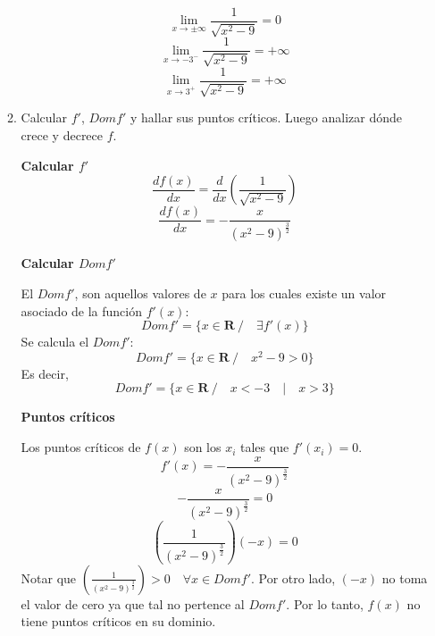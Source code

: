 \documentclass{article}
\begin{document}
\begin{enumerate}
\begin{enumerate}
                    $$\lim_{x\to \pm \infty} \frac{1}{\sqrt{x^2-9}} = 0$$
                    $$\lim_{x\to -3^-} \frac{1}{\sqrt{x^2-9}} = +\infty$$
                    $$\lim_{x\to 3^+} \frac{1}{\sqrt{x^2-9}} = +\infty$$

              \item Calcular $f'$, $Domf'$ y hallar sus puntos críticos. Luego analizar dónde crece y decrece $f$.

                    \textbf{Calcular $f'$}
                    $$\frac{d f(x)}{dx} = \frac{d}{d x} \left(\frac{1}{\sqrt{x^2-9}} \right)$$
                    $$\frac{d f(x)}{dx}= -\frac{x}{(x^2-9)^{\frac{3}{2}}}$$

                    \textbf{Calcular $Domf'$}

                    El $Domf'$, son aquellos valores de $x$ para los cuales existe un valor asociado de la función $f'(x)$:
                    $$Domf' = \{ x \in \mathbf{R}\ / \quad \exists f'(x)\}$$
                    Se calcula el $Domf'$:
                    $$Domf'= \{ x \in \mathbf{R}\ / \quad x^2-9 > 0\}$$
                    Es decir,
                    $$Domf'= \{ x \in \mathbf{R}\ / \quad x<-3 \quad | \quad x>3 \}$$

                    \textbf{Puntos críticos}

                    Los puntos críticos de $f(x)$ son los $x_i$ tales que $f'(x_i) = 0$.
                    $$f'(x) = -\frac{x}{(x^2-9)^{\frac{3}{2}}}$$
                    $$-\frac{x}{(x^2-9)^{\frac{3}{2}}} = 0$$
                    $$\left(\frac{1}{(x^2-9)^{\frac{3}{2}}} \right) (-x) = 0$$
                    Notar que $\left(\frac{1}{(x^2-9)^{\frac{3}{2}}} \right) > 0 \quad \forall x \in Domf'$. Por otro lado, $(-x)$ no toma el valor de cero ya que tal no pertence al $Domf'$. Por lo tanto, $f(x)$ no tiene puntos críticos en su dominio.


\end{enumerate}
\end{enumerate}
\end{document}
